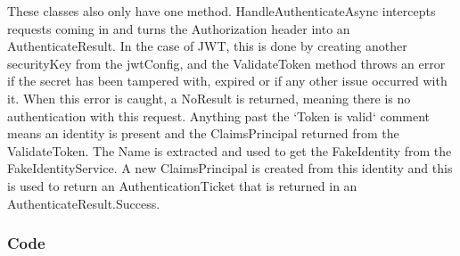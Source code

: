 These classes also only have one method. HandleAuthenticateAsync intercepts requests coming in and turns the Authorization header into an AuthenticateResult. In the case of JWT, this is done by creating another securityKey from the jwtConfig, and the ValidateToken method throws an error if the secret has been tampered with, expired or if any other issue occurred with it. When this error is caught, a NoResult is returned, meaning there is no authentication with this request. Anything past the `Token is valid` comment means an identity is present and the ClaimsPrincipal returned from the ValidateToken. The Name is extracted and used to get the FakeIdentity from the FakeIdentityService. A new ClaimsPrincipal is created from this identity and this is used to return an AuthenticationTicket that is returned in an AuthenticateResult.Success.

\subsubsection{Code}

